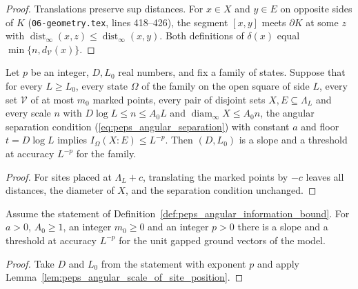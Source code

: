 \begin{proof}\leanok
    Translations preserve sup distances. For $x\in X$ and $y\in E$ on opposite sides of $K$ (\texttt{06-geometry.tex}, lines 418--426), the segment $[x,y]$ meets $\partial K$ at some $z$ with
    $\operatorname{dist}_\infty(x,z)\le\operatorname{dist}_\infty(x,y)$. Both definitions of $\delta(x)$ equal $\min\{n,d_{\mathcal V}(x)\}$.
\end{proof}

\begin{lemma}
    \label{lem:peps_angular_scale_of_site_position}
    \leanok
    Let $p$ be an integer, $D,L_0$ real numbers, and fix a family of states.
    Suppose that for every $L\ge L_0$, every state $\Omega$ of the family on
    the open square of side $L$, every set
    $\mathcal V$ of at most $m_0$ marked points, every pair of disjoint sets
    $X,E\subseteq\Lambda_L$ and every scale $n$ with $D\log L\le n\le A_0L$ and
    $\operatorname{diam}_\infty X\le A_0n$, the angular separation condition
    (\ref{eq:peps_angular_separation}) with constant $a$ and floor $t=D\log L$
    implies $I_\Omega(X:E)\le L^{-p}$. Then $(D,L_0)$ is a slope and a
    threshold at accuracy $L^{-p}$ for the family.
\end{lemma}

\begin{proof}\leanok
    For sites placed at $\Lambda_L+c$, translating the marked points by $-c$
    leaves all distances, the diameter of $X$, and the separation condition
    unchanged.
\end{proof}

\begin{lemma}
    \label{thm:peps_angular_scale_exists}
    \leanok
    Assume the statement of
    Definition~\ref{def:peps_angular_information_bound}. For $a>0$,
    $A_0\ge1$, an integer $m_0\ge0$ and an integer $p>0$ there is a slope
    and a threshold at accuracy $L^{-p}$ for the unit gapped ground vectors of
    the model.
\end{lemma}

\begin{proof}\leanok
    Take $D$ and $L_0$ from the statement with exponent $p$ and apply
    Lemma~\ref{lem:peps_angular_scale_of_site_position}.
\end{proof}

